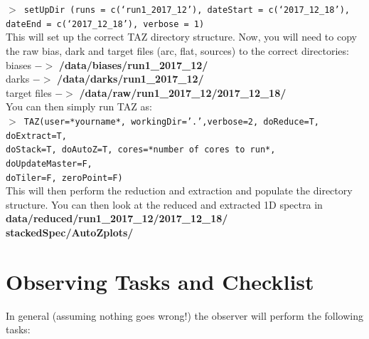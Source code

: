 \documentclass[12pt]{article}
\begin{document}
\texttt{$>$ setUpDir (runs = c(`run1\_2017\_12'), dateStart = c(`2017\_12\_18'), dateEnd = c(`2017\_12\_18'), verbose = 1)} \\

 This will set up the correct TAZ directory structure. Now, you will need to copy the raw bias, dark and target files (arc, flat, sources) to the correct directories:\\

biases $->$ \textbf{/data/biases/run1\_2017\_12/}\\
darks $->$ \textbf{/data/darks/run1\_2017\_12/}\\
target files $->$ \textbf{/data/raw/run1\_2017\_12/2017\_12\_18/}\\

You can then simply run TAZ as:\\

\texttt{$>$ TAZ(user=*yourname*, workingDir='.',verbose=2, doReduce=T, doExtract=T,  \\ doStack=T, doAutoZ=T, cores=*number of cores to run*, doUpdateMaster=F, \\ doTiler=F, zeroPoint=F)} \\

This will then perform the reduction and extraction and populate the directory structure. You can then look at the reduced and extracted 1D spectra in \textbf{data/reduced/run1\_2017\_12/2017\_12\_18/ \\ stackedSpec/AutoZplots/ } 


\section{Observing Tasks and Checklist}
\label{sec:summary}

In general (assuming nothing goes wrong!) the observer will perform the following tasks:\\
\end{document}
